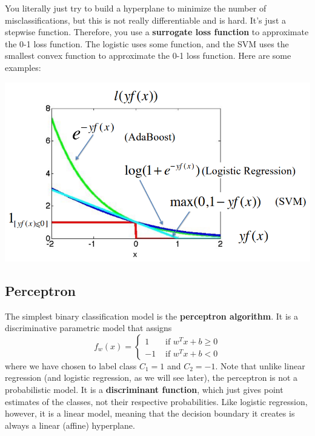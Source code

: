 \documentclass{article}
\begin{document}
    You literally just try to build a hyperplane to minimize the number of misclassifications, but this is not really differentiable and is hard. It's just a stepwise function. Therefore, you use a \textbf{surrogate loss function} to approximate the 0-1 loss function. The logistic uses some function, and the SVM uses the smallest convex function to approximate the 0-1 loss function. Here are some examples: 
    \begin{center}
      \includegraphics[scale=0.35]{img/loss_functions_class.png}
    \end{center}

  \subsection{Perceptron}

    \begin{definition}
      The simplest binary classification model is the \textbf{perceptron algorithm}. It is a discriminative parametric model that assigns 
      \begin{equation}
        f_w (x) = \begin{cases} 1 & \text{ if } w^T x + b \geq 0 \\ -1 & \text { if } w^T x + b < 0 \end{cases}
      \end{equation}
      where we have chosen to label class $C_1 = 1$ and $C_2 = -1$. Note that unlike linear regression (and logistic regression, as we will see later), the perceptron is not a probabilistic model. It is a \textbf{discriminant function}, which just gives point estimates of the classes, not their respective probabilities. Like logistic regression, however, it is a linear model, meaning that the decision boundary it creates is always a linear (affine) hyperplane. 
    \end{definition}
\end{document}

